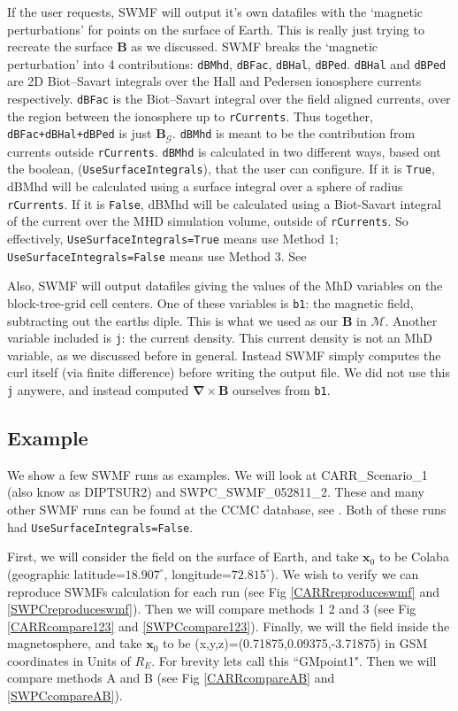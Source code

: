 \documentclass{article}
\newcommand\B{\mathbf{B}}
\newcommand\x{\mathbf{x}}
\newcommand\M{\mathcal{M}}
\newcommand\G{\mathcal{G}}
\newcommand\curl[1]{\boldsymbol{\nabla} \times #1}
\begin{document}
If the user requests, SWMF will output it's own datafiles with the `magnetic perturbations' for points on the surface of Earth.
This is really just trying to recreate the surface $\B$ as we discussed.
SWMF breaks the `magnetic perturbation' into 4 contributions:
\texttt{dBMhd}, \texttt{dBFac}, \texttt{dBHal}, \texttt{dBPed}.
\texttt{dBHal} and \texttt{dBPed} are 2D Biot--Savart integrals over the Hall and Pedersen ionosphere currents respectively.
\texttt{dBFac} is the Biot--Savart integral over the field aligned currents, over the region between the ionosphere up to \texttt{rCurrents}.
Thus together, \texttt{dBFac+dBHal+dBPed} is just $\B_{\G}$.
\texttt{dBMhd} is meant to be the contribution from currents outside \texttt{rCurrents}.
\texttt{dBMhd} is calculated in two different ways, based ont the boolean, (\texttt{UseSurfaceIntegrals}), that the user can configure.
If it is \texttt{True}, dBMhd will be calculated
using a surface integral over a sphere of radius \texttt{rCurrents}.
If it is \texttt{False}, dBMhd will be calculated
using a Biot-Savart integral of the current over the
MHD simulation volume, outside of \texttt{rCurrents}.
So effectively,
\texttt{UseSurfaceIntegrals=True} means use Method 1;
\texttt{UseSurfaceIntegrals=False} means use Method 3. See \citep{swmfmanual}

Also, SWMF will output datafiles giving the values of the MhD variables on the block-tree-grid cell centers.
One of these variables is \texttt{b1}: the magnetic field, subtracting out the earths diple.
This is what we used as our $\B$ in $\M$.
Another variable included is \texttt{j}: the current density.
This current density is not an MhD variable, as we discussed before in general.
Instead SWMF simply computes the curl itself (via finite difference) before writing the output file.
We did not use this \texttt{j} anywere, and instead computed $\curl \B$ ourselves from \texttt{b1}.

\subsection{Example}

We show a few SWMF runs as examples. We will look at CARR\_Scenario\_1 (also know as DIPTSUR2) and SWPC\_SWMF\_052811\_2.
These and many other SWMF runs can be found at the CCMC database, see \citep{ccmcdatabase}.
Both of these runs had \texttt{UseSurfaceIntegrals=False}.

First, we will consider the field on the surface of Earth, and take $\x_0$ to be Colaba (geographic latitude=$18.907^\circ$, longitude=$72.815^\circ$).
We wish to verify we can reproduce SWMFs calculation for each run (see Fig \ref{CARRreproduceswmf} and \ref{SWPCreproduceswmf}).
Then we will compare methods 1 2 and 3 (see Fig \ref{CARRcompare123} and \ref{SWPCcompare123}).
Finally, we will the field inside the magnetosphere,
and take $\x_0$ to be (x,y,z)=(0.71875,0.09375,-3.71875) in GSM coordinates in Units of $R_E$.
For brevity lets call this ``GMpoint1".
Then we will compare methods A and B (see Fig \ref{CARRcompareAB} and \ref{SWPCcompareAB}).
\end{document}
